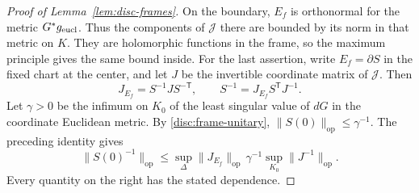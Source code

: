 \begin{proof}[Proof of Lemma~\ref{lem:disc-frames}]
On the boundary, $E_f$ is orthonormal for the metric $G^*g_{\rm eucl}$.
Thus the components of $\mathcal J$ there are bounded by its norm
in that metric on $K$.  They are holomorphic functions in the
frame, so the maximum principle gives the same bound inside.
For the last assertion, write $E_f=\partial S$ in the fixed chart
at the center, and let $J$ be the invertible coordinate matrix of
$\mathcal J$.  Then
\[
 J_{E_f}=S^{-1}JS^{-\mathsf T},\qquad
 S^{-1}=J_{E_f}S^{\mathsf T}J^{-1}.
\]
Let $\gamma>0$ be the infimum on $K_0$ of the least singular value
of $dG$ in the coordinate Euclidean metric.  By
\eqref{disc:frame-unitary}, $\|S(0)\|_{\mathrm{op}}\le\gamma^{-1}$.
The preceding identity gives
\[
 \|S(0)^{-1}\|_{\mathrm{op}}
 \le \sup_\Delta\|J_{E_f}\|_{\mathrm{op}}\,
                \gamma^{-1}\sup_{K_0}\|J^{-1}\|_{\mathrm{op}}.
\]
Every quantity on the right has the stated dependence.
\end{proof}
